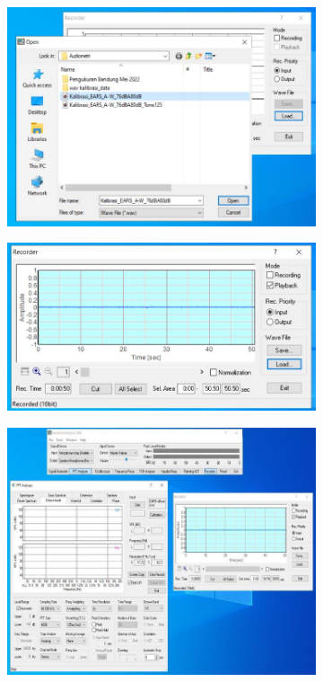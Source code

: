 \documentclass{article}
\begin{document}
	\begin{figure}[H]
		\centering
		\begin{subfigure}[]{.45\textwidth}
			\includegraphics[width=\textwidth]{images/dengung/rta_calib0}
			\caption{}
		\end{subfigure}
		\begin{subfigure}[]{.45\textwidth}
			\includegraphics[width=\textwidth]{images/dengung/rta_calib1}
			\caption{}
		\end{subfigure}
		\begin{subfigure}[]{.45\textwidth}
			\includegraphics[width=\textwidth]{images/dengung/rta_calib2}

\end{subfigure}
\end{figure}
\end{document}
